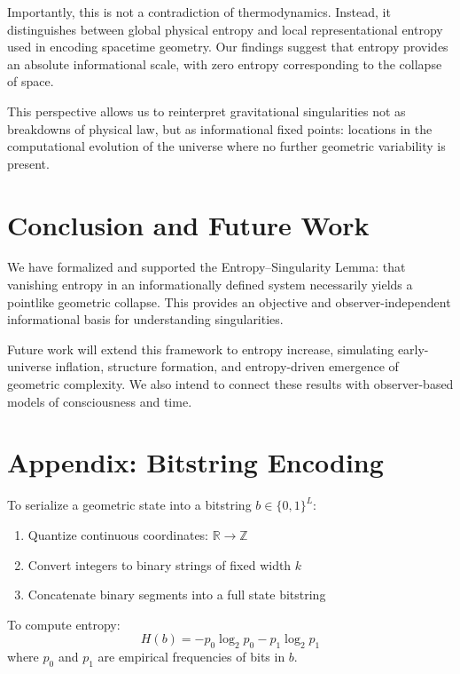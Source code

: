 \documentclass[11pt]{article}
\begin{document}
Importantly, this is not a contradiction of thermodynamics. Instead, it distinguishes between global physical entropy and local representational entropy used in encoding spacetime geometry. Our findings suggest that entropy provides an absolute informational scale, with zero entropy corresponding to the collapse of space.

This perspective allows us to reinterpret gravitational singularities not as breakdowns of physical law, but as informational fixed points: locations in the computational evolution of the universe where no further geometric variability is present.

\section{Conclusion and Future Work}

We have formalized and supported the Entropy--Singularity Lemma: that vanishing entropy in an informationally defined system necessarily yields a pointlike geometric collapse. This provides an objective and observer-independent informational basis for understanding singularities.

Future work will extend this framework to entropy increase, simulating early-universe inflation, structure formation, and entropy-driven emergence of geometric complexity. We also intend to connect these results with observer-based models of consciousness and time.

\appendix

\section{Appendix: Bitstring Encoding}

To serialize a geometric state into a bitstring $b \in \{0,1\}^L$:
\begin{enumerate}
  \item Quantize continuous coordinates: $\mathbb{R} \to \mathbb{Z}$
  \item Convert integers to binary strings of fixed width $k$
  \item Concatenate binary segments into a full state bitstring
\end{enumerate}

To compute entropy:
\[
  H(b) = -p_0 \log_2 p_0 - p_1 \log_2 p_1
\]
where $p_0$ and $p_1$ are empirical frequencies of bits in $b$.

\printbibliography
\end{document}
